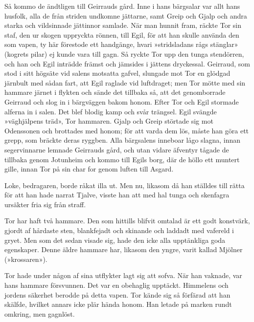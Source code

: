 Så kommo de ändtligen till Geirrauds gård. Inne i hans bärgsalar var
allt hans husfolk, alla de från striden undkomne jättarne, samt Greip
och Gjalp och andra starka och vildsinnade jättinnor samlade. När man
hunnit fram, räckte Tor sin staf, den ur skogen uppryckta rönnen, till
Egil, för att han skulle använda den som vapen, ty här förestode ett
handgänge, hvari »stridsladans rågs stänglar» (kogrets pilar) ej kunde
vara till gagn. Så ryckte Tor upp den tunga stendörren, och han och Egil
inträdde främst och jämsides i jättens dryckessal. Geirraud, som stod i
sitt högsäte vid salens motsatta gafvel, slungade mot Tor en glödgad
järnbult med sådan fart, att Egil raglade vid luftdraget; men Tor mötte
med sin hammare järnet i flykten och sände det tillbaka så, att det
genomborrade Geirraud och slog in i bärgväggen bakom honom. Efter Tor
och Egil stormade alferna in i salen. Det blef blodig kamp och svår
trängsel. Egil svängde »väghjälpens träd», Tor hammaren. Gjalp och Greip
störtade sig mot Odenssonen och brottades med honom; för att varda dem
lös, måste han göra ett grepp, som bräckte deras ryggben. Alla
bärgsalens inneboar lågo slagna, innan segervinnarne lemnade Geirrauds
gård, och utan vidare äfventyr tågade de tillbaka genom Jotunheim och
kommo till Egils borg, där de höllo ett muntert gille, innan Tor på sin
char for genom luften till Asgard.

Loke, bedragaren, borde råkat illa ut. Men nu, likasom då han ställdes
till rätta för att han hade narrat Tjalve, visste han att med hal tunga
och skenfagra ursäkter fria sig från straff.



Tor har haft två hammare. Den som hittills blifvit omtalad är ett godt
konstvärk, gjordt af hårdaste sten, blankfejadt och skinande och laddadt
med vafereld i gryet. Men som det sedan visade sig, hade den icke alla
upptänkliga goda egenskaper. Denne äldre hammare har, likasom den yngre,
varit kallad Mjölner (»krossaren»).

Tor hade under någon af sina utflykter lagt sig att sofva. När han
vaknade, var hans hammare försvunnen. Det var en obehaglig upptäckt.
Himmelens och jordens säkerhet berodde på detta vapen. Tor kände sig så
förfärad att han skälfde, hvilket annars icke plär hända honom. Han
letade på marken rundt omkring, men gagnlöst.

